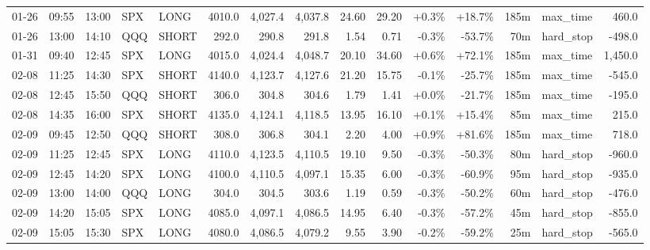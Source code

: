 \documentclass[11pt,a4paper,twoside]{article}
\begin{document}
\begin{landscape}
\begin{center}
\begin{longtable}{>{\color{txtmain}}l l l l l r r r r r r r r >{\color{txtmain}}l r}
01-26 & 09:55 & 13:00 & SPX & LONG & 4010.0 & 4,027.4 & 4,037.8 & 24.60 & 29.20 & \textcolor{wingreen}{+0.3\%} & \textcolor{wingreen}{+18.7\%} & 185m & max\_time & \textcolor{wingreen}{460.0} \\
01-26 & 13:00 & 14:10 & QQQ & SHORT & 292.0 & 290.8 & 291.8 & 1.54 & 0.71 & \textcolor{lossred}{-0.3\%} & \textcolor{lossred}{-53.7\%} & 70m & hard\_stop & \textcolor{lossred}{-498.0} \\
01-31 & 09:40 & 12:45 & SPX & LONG & 4015.0 & 4,024.4 & 4,048.7 & 20.10 & 34.60 & \textcolor{wingreen}{+0.6\%} & \textcolor{wingreen}{+72.1\%} & 185m & max\_time & \textcolor{wingreen}{1,450.0} \\
02-08 & 11:25 & 14:30 & SPX & SHORT & 4140.0 & 4,123.7 & 4,127.6 & 21.20 & 15.75 & \textcolor{lossred}{-0.1\%} & \textcolor{lossred}{-25.7\%} & 185m & max\_time & \textcolor{lossred}{-545.0} \\
02-08 & 12:45 & 15:50 & QQQ & SHORT & 306.0 & 304.8 & 304.6 & 1.79 & 1.41 & \textcolor{wingreen}{+0.0\%} & \textcolor{lossred}{-21.7\%} & 185m & max\_time & \textcolor{lossred}{-195.0} \\
02-08 & 14:35 & 16:00 & SPX & SHORT & 4135.0 & 4,124.1 & 4,118.5 & 13.95 & 16.10 & \textcolor{wingreen}{+0.1\%} & \textcolor{wingreen}{+15.4\%} & 85m & max\_time & \textcolor{wingreen}{215.0} \\
02-09 & 09:45 & 12:50 & QQQ & SHORT & 308.0 & 306.8 & 304.1 & 2.20 & 4.00 & \textcolor{wingreen}{+0.9\%} & \textcolor{wingreen}{+81.6\%} & 185m & max\_time & \textcolor{wingreen}{718.0} \\
02-09 & 11:25 & 12:45 & SPX & LONG & 4110.0 & 4,123.5 & 4,110.5 & 19.10 & 9.50 & \textcolor{lossred}{-0.3\%} & \textcolor{lossred}{-50.3\%} & 80m & hard\_stop & \textcolor{lossred}{-960.0} \\
02-09 & 12:45 & 14:20 & SPX & LONG & 4100.0 & 4,110.5 & 4,097.1 & 15.35 & 6.00 & \textcolor{lossred}{-0.3\%} & \textcolor{lossred}{-60.9\%} & 95m & hard\_stop & \textcolor{lossred}{-935.0} \\
02-09 & 13:00 & 14:00 & QQQ & LONG & 304.0 & 304.5 & 303.6 & 1.19 & 0.59 & \textcolor{lossred}{-0.3\%} & \textcolor{lossred}{-50.2\%} & 60m & hard\_stop & \textcolor{lossred}{-476.0} \\
02-09 & 14:20 & 15:05 & SPX & LONG & 4085.0 & 4,097.1 & 4,086.5 & 14.95 & 6.40 & \textcolor{lossred}{-0.3\%} & \textcolor{lossred}{-57.2\%} & 45m & hard\_stop & \textcolor{lossred}{-855.0} \\
02-09 & 15:05 & 15:30 & SPX & LONG & 4080.0 & 4,086.5 & 4,079.2 & 9.55 & 3.90 & \textcolor{lossred}{-0.2\%} & \textcolor{lossred}{-59.2\%} & 25m & hard\_stop & \textcolor{lossred}{-565.0} \\

\end{longtable}
\end{center}
\end{landscape}
\end{document}
